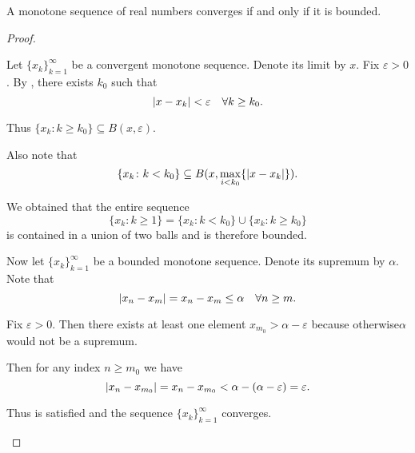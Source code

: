 \begin{proposition}\label{thm:real_monotone_sequence_converges_iff_bounded}
  A monotone sequence of real numbers converges if and only if it is bounded.
\end{proposition}
\begin{proof}\mbox{}
  \begin{description}
    \Implies Let \( \{ x_k \}_{k=1}^\infty \) be a convergent monotone sequence. Denote its limit by \( x \). Fix \( \varepsilon > 0 \). By , there exists \( k_0 \) such that
    \begin{equation*}
      \left\vert x - x_k \right\vert < \varepsilon \quad\forall k \geq k_0.
    \end{equation*}

    Thus \( \{ x_k \colon k \geq k_0 \} \subseteq B(x, \varepsilon) \).

    Also note that
    \begin{equation*}
      \{ x_k \colon k < k_0 \} \subseteq B(x, \max_{i < k_0} \{ \left\vert x - x_k \right\vert \}).
    \end{equation*}

    We obtained that the entire sequence
    \begin{equation*}
      \{ x_k \colon k \geq 1 \} = \{ x_k \colon k < k_0 \} \cup \{ x_k \colon k \geq k_0 \}
    \end{equation*}
    is contained in a union of two balls and is therefore bounded.

    \ImpliedBy Now let \( \{ x_k \}_{k=1}^\infty \) be a bounded monotone sequence. Denote its supremum by \( \alpha \). Note that
    \begin{equation*}
      \left\vert x_n - x_m \right\vert = x_n - x_m \leq \alpha \quad\forall n \geq m.
    \end{equation*}

    Fix \( \varepsilon > 0 \). Then there exists at least one element \( x_{m_0} > \alpha - \varepsilon \) because otherwise\LEM \( \alpha \) would not be a supremum.

    Then for any index \( n \geq m_0 \) we have
    \begin{equation*}
      \left\vert x_n - x_{m_0} \right\vert = x_n - x_{m_0} < \alpha - (\alpha - \varepsilon) = \varepsilon.
    \end{equation*}

    Thus  is satisfied and the sequence \( \{ x_k \}_{k=1}^\infty \) converges.
  \end{description}
\end{proof}
